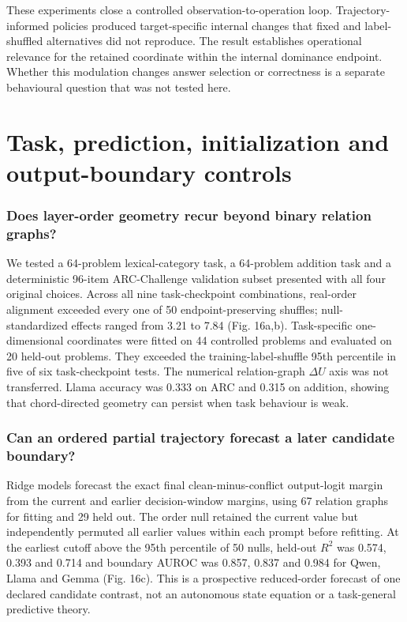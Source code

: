 \documentclass[11pt]{article}
\begin{document}
These experiments close a controlled observation-to-operation loop. Trajectory-informed policies produced target-specific internal changes that fixed and label-shuffled alternatives did not reproduce. The result establishes operational relevance for the retained coordinate within the internal dominance endpoint. Whether this modulation changes answer selection or correctness is a separate behavioural question that was not tested here.


\section{Task, prediction, initialization and output-boundary controls}
\subsubsection*{Does layer-order geometry recur beyond binary relation graphs?}
We tested a 64-problem lexical-category task, a 64-problem addition task and a deterministic 96-item ARC-Challenge validation subset presented with all four original choices. Across all nine task-checkpoint combinations, real-order alignment exceeded every one of 50 endpoint-preserving shuffles; null-standardized effects ranged from 3.21 to 7.84 (Fig. 16a,b). Task-specific one-dimensional coordinates were fitted on 44 controlled problems and evaluated on 20 held-out problems. They exceeded the training-label-shuffle 95th percentile in five of six task-checkpoint tests. The numerical relation-graph $\Delta U$ axis was not transferred. Llama accuracy was 0.333 on ARC and 0.315 on addition, showing that chord-directed geometry can persist when task behaviour is weak.

\subsubsection*{Can an ordered partial trajectory forecast a later candidate boundary?}
Ridge models forecast the exact final clean-minus-conflict output-logit margin from the current and earlier decision-window margins, using 67 relation graphs for fitting and 29 held out. The order null retained the current value but independently permuted all earlier values within each prompt before refitting. At the earliest cutoff above the 95th percentile of 50 nulls, held-out $R^2$ was 0.574, 0.393 and 0.714 and boundary AUROC was 0.857, 0.837 and 0.984 for Qwen, Llama and Gemma (Fig. 16c). This is a prospective reduced-order forecast of one declared candidate contrast, not an autonomous state equation or a task-general predictive theory.
\end{document}
